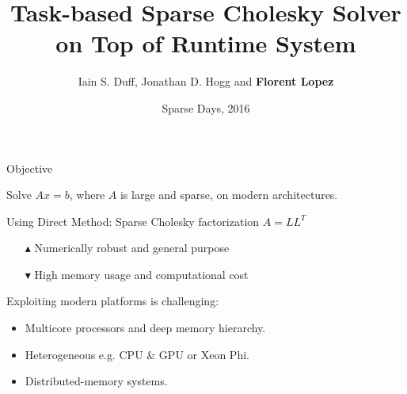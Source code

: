 \documentclass{beamer}
\author{Iain S. Duff, Jonathan D. Hogg and {\bf Florent Lopez}}
\institute{Rutherford Appleton Laboratory
  \\ \alert{NLAFET Project}}
\title{Task-based Sparse Cholesky Solver on Top of Runtime System}
\date{Sparse Days, 2016}
\newcommand{\dg}[1]{\textcolor{mgreen}{#1\xspace}}
\newcommand{\dr}[1]{\textcolor{mred}{#1\xspace}}
\newcommand{\db}[1]{\textcolor{mblue}{#1\xspace}}
\begin{document}
\begin{frame}[t,plain]
\titlepage
\end{frame}

\begin{frame}{Objective}

  Solve \alert{$Ax=b$}, where $A$ is \db{large} and \db{sparse}, on
  modern architectures.

  \vspace{0.5cm}
  
  Using \db{Direct Method}: Sparse Cholesky factorization $A=LL^{T}$
  \begin{itemize}
  \item[\dg{$\blacktriangle$}] Numerically robust and general purpose
  \item[\dr{$\blacktriangledown$}] High memory usage and computational cost
  \end{itemize}

  \vspace{0.5cm}

  Exploiting modern platforms is challenging:
  \begin{itemize}
  \item \db{Multicore} processors and deep \db{memory hierarchy}.
  \item \db{Heterogeneous} e.g. CPU \& GPU or Xeon Phi.
  \item \db{Distributed-memory} systems. 
  \end{itemize}

\end{frame}
\end{document}
